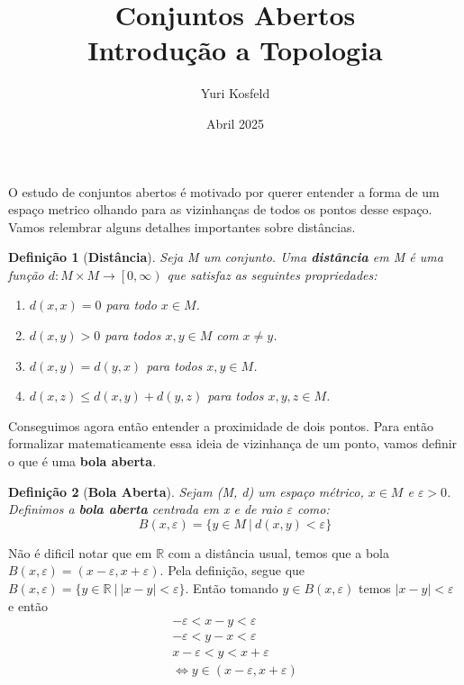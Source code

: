 \documentclass{article}
\title{Conjuntos Abertos \\ \large Introdução a Topologia}
\author{Yuri Kosfeld}
\date{Abril 2025}
\newtheorem*{definition}{Definição}
\begin{document}
\maketitle

O estudo de conjuntos abertos é motivado por querer entender a forma de um espaço metrico olhando 
para as vizinhanças de todos os pontos desse espaço. Vamos relembrar alguns
detalhes importantes sobre distâncias.

\begin{definition}[\textbf{Distância}]
    Seja M um conjunto. Uma \textbf{distância} em M é uma função $d: M \times M \rightarrow \left[0, \infty \right)$
    que satisfaz as seguintes propriedades: 
    \begin{enumerate}
        \item $d(x,x) = 0$ para todo $x \in M$.
        \item $d(x,y) > 0$ para todos $x, y \in M$ com $x \neq y$.
        \item $d(x, y) = d(y, x)$ para todos $x,y \in M$.
        \item $d(x,z) \leq d(x, y) + d(y, z)$ para todos $x, y, z \in M$.
    \end{enumerate}
\end{definition}

Conseguimos agora então entender a proximidade de dois pontos. Para então formalizar matematicamente
essa ideia de vizinhança de um ponto, vamos definir o que é uma \textbf{bola aberta}.

\begin{definition}[\textbf{Bola Aberta}]
    Sejam (M, d) um espaço métrico, $x\in M$ e $\varepsilon > 0$. Definimos a \textbf{bola aberta}
    centrada em x e de raio $\varepsilon$ como:
    \[ B(x, \varepsilon) = \{ y \in M \: | \: d(x, y) < \varepsilon \} \]
\end{definition}

Não é dificil notar que em $\mathbb{R}$ com a distância usual, temos que a bola $B(x, \varepsilon) = (x - \varepsilon, x + \varepsilon)$.
Pela definição, segue que $B(x, \varepsilon) = \{ y \in \mathbb{R} \: | \: | x - y | < \varepsilon \}$.
Então tomando $y \in B(x, \varepsilon)$ temos $| x - y | < \varepsilon$ e então
\begin{align*}
    -\varepsilon < x - y < \varepsilon \\
    -\varepsilon < y - x < \varepsilon \\
    x - \varepsilon < y < x + \varepsilon\\
    \Leftrightarrow  y \in (x - \varepsilon, x + \varepsilon)
\end{align*}
\end{document}
